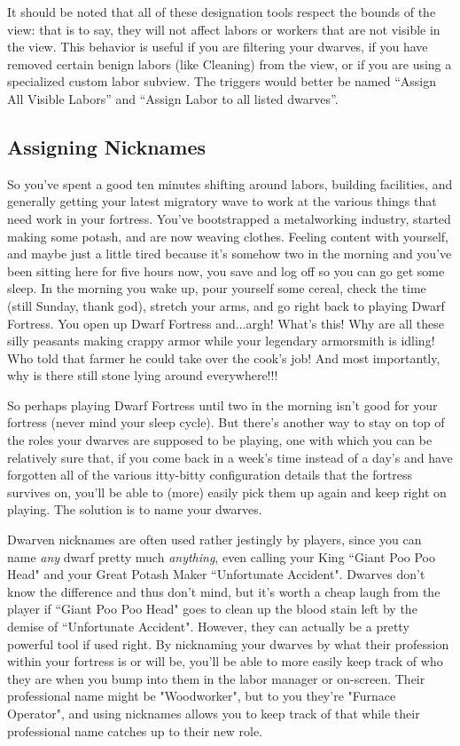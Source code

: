 \documentclass[]{article}
\begin{document}
It should be noted that all of these designation tools respect the bounds of the view: that is to say,
they will not affect labors or workers that are not visible in the view. This behavior is useful if you
are filtering your dwarves, if you have removed certain benign labors (like Cleaning) from the view, or
if you are using a specialized custom labor subview. The triggers would better be named ``Assign All
Visible Labors'' and ``Assign Labor to all listed dwarves''.

\newpage
\subsection{Assigning Nicknames}
\label{sec:Assigning Nicknames}

So you've spent a good ten minutes shifting around labors, building facilities, and generally getting
your latest migratory wave to work at the various things that need work in your fortress. You've
bootstrapped a metalworking industry, started making some potash, and are now weaving clothes. Feeling
content with yourself, and maybe just a little tired because it's somehow two in the morning and you've
been sitting here for five hours now, you save and log off so you can go get some sleep. In the morning
you wake up, pour yourself some cereal, check the time (still Sunday, thank god), stretch your arms, and
go right back to playing Dwarf Fortress. You open up Dwarf Fortress and...argh! What's this! Why are all
these silly peasants making crappy armor while your legendary armorsmith is idling! Who told that farmer
he could take over the cook's job! And most importantly, why is there still stone lying around
everywhere!!!

So perhaps playing Dwarf Fortress until two in the morning isn't good for your fortress (never mind your
sleep cycle). But there's another way to stay on top of the roles your dwarves are supposed to be
playing, one with which you can be relatively sure that, if you come back in a week's time instead of a
day's and have forgotten all of the various itty-bitty configuration details that the fortress survives
on, you'll be able to (more) easily pick them up again and keep right on playing. The solution is to 
name your dwarves.

Dwarven nicknames are often used rather jestingly by players, since you can name \emph{any} dwarf pretty
much \emph{anything}, even calling your King ``Giant Poo Poo Head" and your Great Potash Maker
``Unfortunate Accident". Dwarves don't know the difference and thus don't mind, but it's worth a cheap
laugh from the player if ``Giant Poo Poo Head" goes to clean up the blood stain left by the demise of
``Unfortunate Accident". However, they can actually be a pretty powerful tool if used right. By
nicknaming your dwarves by what their profession within your fortress is or will be, you'll be able to
more easily keep track of who they are when you bump into them in the labor manager or on-screen. Their
professional name might be "Woodworker", but to you they're "Furnace Operator", and using nicknames
allows you to keep track of that while their professional name catches up to their new role.
\end{document}
